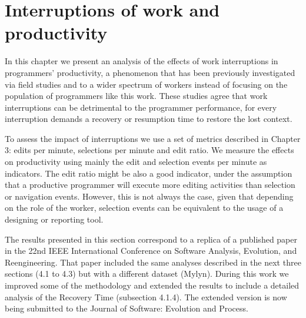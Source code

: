 



\chapter{Interruptions of work and productivity}
In this chapter we present an analysis of the effects of work interruptions in programmers' productivity, a phenomenon that has been previously investigated via field studies and to a wider spectrum of workers \cite{GM04, MGK08, CHW04, ABV12} instead of focusing on the population of programmers like this work. These studies agree that work interruptions can be detrimental to the programmer performance, for every interruption demands a recovery or resumption time to restore the lost context.

To assess the impact of interruptions we use a set of metrics described in Chapter 3: edits per minute, selections per minute and edit ratio. We measure the effects on productivity using mainly the edit and selection events per minute as indicators. The edit ratio \cite{KM06} might be also a good indicator, under the assumption that a productive programmer will execute more editing activities than selection or navigation events. However, this is not always the case, given that depending on the role of the worker, selection events can be equivalent to the usage of a designing or reporting tool.

The results presented in this section correspond to a replica of a published paper \cite{SRV15} in the 22nd IEEE International Conference on Software Analysis, Evolution, and Reengineering. That paper included the same analyses described in the next three sections (4.1 to 4.3) but with a different dataset (Mylyn). During this work we improved some of the methodology and extended the results to include a detailed analysis of the Recovery Time (subsection 4.1.4). The extended version is now being submitted to the Journal of Software: Evolution and Process.

